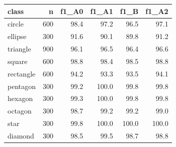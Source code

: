 \begin{tabular}{lrrrrr}
\toprule
class & n & f1\_A0 & f1\_A1 & f1\_B & f1\_A2 \\
\midrule
circle & 600 & 98.4 & 97.2 & 96.5 & 97.1 \\
ellipse & 300 & 91.6 & 90.1 & 89.8 & 91.2 \\
triangle & 900 & 96.1 & 96.5 & 96.4 & 96.6 \\
square & 600 & 98.8 & 98.4 & 98.5 & 98.8 \\
rectangle & 600 & 94.2 & 93.3 & 93.5 & 94.1 \\
pentagon & 300 & 99.2 & 100.0 & 99.8 & 99.8 \\
hexagon & 300 & 99.3 & 100.0 & 99.8 & 99.8 \\
octagon & 300 & 98.7 & 99.2 & 99.2 & 99.0 \\
star & 300 & 99.8 & 100.0 & 100.0 & 100.0 \\
diamond & 300 & 98.5 & 99.5 & 98.7 & 98.8 \\
\bottomrule
\end{tabular}

